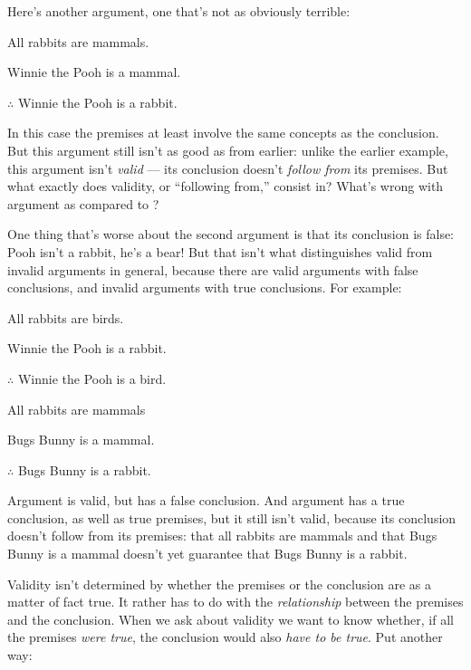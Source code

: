 Here's another argument, one that's not as obviously terrible:
\begin{earg}
\item[\ex{exarg2}]All rabbits are mammals.
\item[] Winnie the Pooh is a mammal.
\item[] $\therefore$ Winnie the Pooh is a rabbit.
\end{earg}
In this case the premises at least involve the same concepts as the conclusion.  But this argument still isn't as good as  from earlier: unlike the earlier example, this argument isn't \emph{valid} --- its conclusion doesn't \emph{follow from} its premises.  But what exactly does validity, or ``following from,'' consist in?  What's wrong with argument  as compared to ?

One thing that's worse about the second argument is that its conclusion is false: Pooh isn't a rabbit, he's a bear!  But that isn't what distinguishes valid from invalid arguments in general, because there are valid arguments with false conclusions, and invalid arguments with true conclusions.  For example:
\begin{earg}
\item[\ex{exarg3}]All rabbits are birds.
\item[] Winnie the Pooh is a rabbit.
\item[] $\therefore$ Winnie the Pooh is a bird.
\end{earg}

\begin{earg}
\item[\ex{exarg4}]All rabbits are mammals
\item[] Bugs Bunny is a mammal.
\item[] $\therefore$ Bugs Bunny is a rabbit.
\end{earg}
Argument  is valid, but has a false conclusion.  And argument  has a true conclusion, as well as true premises, but it still isn't valid, because its conclusion doesn't follow from its premises: that all rabbits are mammals and that Bugs Bunny is a mammal doesn't yet guarantee that Bugs Bunny is a rabbit.


Validity isn't determined by whether the premises or the conclusion are as a matter of fact true.  It rather has to do with the \emph{relationship} between the premises and the conclusion.  When we ask about validity we want to know whether, if all the premises \emph{were true}, the conclusion would also \emph{have to be true}.  Put another way:


